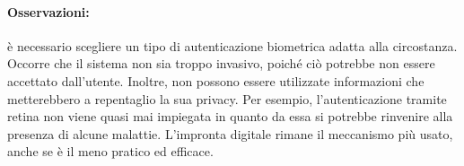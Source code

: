 \paragraph{Osservazioni:}
è necessario scegliere un tipo di autenticazione
biometrica adatta alla circostanza. Occorre che il sistema non sia troppo
invasivo, poiché ciò potrebbe non essere accettato dall'utente.
Inoltre, non possono essere utilizzate informazioni che metterebbero a
repentaglio la sua privacy. Per esempio, l'autenticazione tramite retina non
viene quasi mai impiegata in quanto da essa si potrebbe rinvenire alla presenza
di alcune malattie. L'impronta digitale rimane il meccanismo più usato,
anche se è il meno pratico ed efficace.

